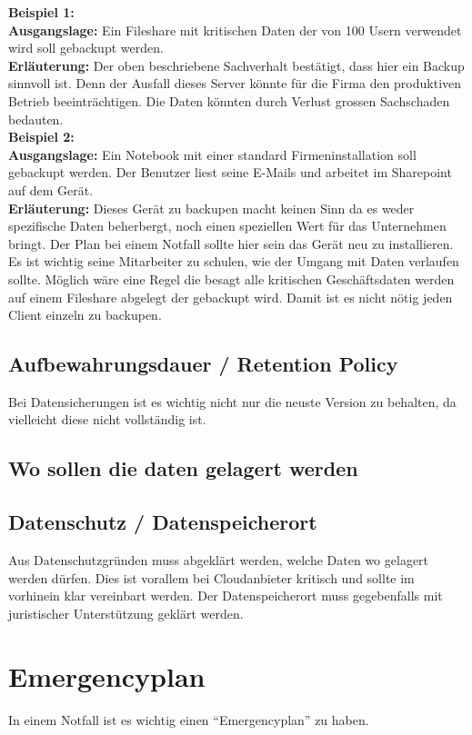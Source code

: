 \textbf{Beispiel 1:}\\
\textbf{Ausgangslage:} Ein Fileshare mit kritischen Daten der von 100 Usern verwendet wird soll gebackupt werden.\\
\textbf{Erläuterung:} Der oben beschriebene Sachverhalt bestätigt, dass hier ein Backup sinnvoll ist. Denn der Ausfall dieses Server könnte für die Firma den produktiven Betrieb beeinträchtigen. Die Daten könnten durch Verlust grossen Sachschaden bedauten.\\


\textbf{Beispiel 2:}\\
\textbf{Ausgangslage:} Ein Notebook mit einer standard Firmeninstallation soll gebackupt werden. Der Benutzer liest seine E-Mails und arbeitet im Sharepoint auf dem Gerät.\\
\textbf{Erläuterung:} Dieses Gerät zu backupen macht keinen Sinn da es weder spezifische Daten beherbergt, noch einen speziellen Wert für das Unternehmen bringt. Der Plan bei einem Notfall sollte hier sein das Gerät neu zu installieren.\\

Es ist wichtig seine Mitarbeiter zu schulen, wie der Umgang mit Daten verlaufen sollte.
Möglich wäre eine Regel die besagt alle kritischen Geschäftsdaten werden auf einem Fileshare abgelegt der gebackupt wird.
Damit ist es nicht nötig jeden Client einzeln zu backupen.

\subsection{Aufbewahrungsdauer / Retention Policy}
Bei Datensicherungen ist es wichtig nicht nur die neuste Version zu behalten, da vielleicht diese nicht vollständig ist.


\subsection{Wo sollen die daten gelagert werden}
\subsection{Datenschutz / Datenspeicherort}
Aus Datenschutzgründen muss abgeklärt werden, welche Daten wo gelagert werden dürfen.
Dies ist vorallem bei Cloudanbieter kritisch und sollte im vorhinein klar vereinbart werden.
Der Datenspeicherort muss gegebenfalls mit juristischer Unterstützung geklärt werden.

\section{Emergencyplan}
In einem Notfall ist es wichtig einen ``Emergencyplan'' zu haben.

